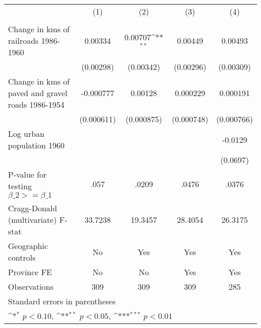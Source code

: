 {
\def\sym#1{\ifmmode^{#1}\else\(^{#1}\)\fi}
\begin{tabular}{l*{4}{c}}
\hline\hline
                &\multicolumn{1}{c}{(1)}&\multicolumn{1}{c}{(2)}&\multicolumn{1}{c}{(3)}&\multicolumn{1}{c}{(4)}\\
                &\multicolumn{1}{c}{}&\multicolumn{1}{c}{}&\multicolumn{1}{c}{}&\multicolumn{1}{c}{}\\
\hline
Change in kms of railroads 1986-1960&  0.00334         &  0.00707\sym{**} &  0.00449         &  0.00493         \\
                &(0.00298)         &(0.00342)         &(0.00296)         &(0.00309)         \\
[1em]
Change in kms of paved and gravel roads 1986-1954&-0.000777         &  0.00128         & 0.000229         & 0.000191         \\
                &(0.000611)         &(0.000875)         &(0.000748)         &(0.000766)         \\
[1em]
Log urban population 1960&                  &                  &                  &  -0.0129         \\
                &                  &                  &                  & (0.0697)         \\
\hline
P-value for testing $\beta\_{2} >= \beta\_{1}$&     .057         &    .0209         &    .0476         &    .0376         \\
Cragg-Donald (multivariate) F-stat&  33.7238         &  19.3457         &  28.4054         &  26.3175         \\
Geographic controls&       No         &      Yes         &      Yes         &      Yes         \\
Province FE     &       No         &       No         &      Yes         &      Yes         \\
Observations    &      309         &      309         &      309         &      285         \\
\hline\hline
\multicolumn{5}{l}{\footnotesize Standard errors in parentheses}\\
\multicolumn{5}{l}{\footnotesize \sym{*} \(p<0.10\), \sym{**} \(p<0.05\), \sym{***} \(p<0.01\)}\\
\end{tabular}
}
